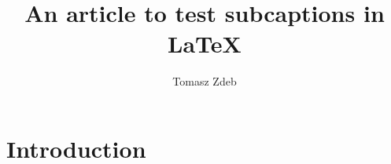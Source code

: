 \documentclass{article}
\title{An article to test subcaptions in \LaTeX}
\author{Tomasz Zdeb}
\date{}
\begin{document}
\maketitle

\section{Introduction}
\end{document}
